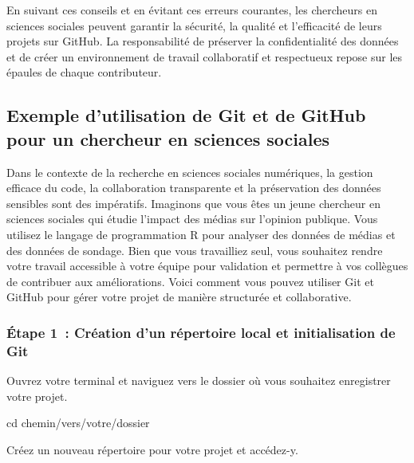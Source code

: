 \documentclass[
  letterpaper,
]{scrbook}
\newenvironment{Shaded}{\begin{snugshade}}{\end{snugshade}}
\newcommand{\BuiltInTok}[1]{\textcolor[rgb]{0.00,0.23,0.31}{#1}}
\newcommand{\NormalTok}[1]{\textcolor[rgb]{0.00,0.23,0.31}{#1}}
\begin{document}
En suivant ces conseils et en évitant ces erreurs courantes, les
chercheurs en sciences sociales peuvent garantir la sécurité, la qualité
et l'efficacité de leurs projets sur GitHub. La responsabilité de
préserver la confidentialité des données et de créer un environnement de
travail collaboratif et respectueux repose sur les épaules de chaque
contributeur.

\hypertarget{exemple-dutilisation-de-git-et-de-github-pour-un-chercheur-en-sciences-sociales}{%
\subsection{Exemple d'utilisation de Git et de GitHub pour un chercheur
en sciences
sociales}\label{exemple-dutilisation-de-git-et-de-github-pour-un-chercheur-en-sciences-sociales}}

Dans le contexte de la recherche en sciences sociales numériques, la
gestion efficace du code, la collaboration transparente et la
préservation des données sensibles sont des impératifs. Imaginons que
vous êtes un jeune chercheur en sciences sociales qui étudie l'impact
des médias sur l'opinion publique. Vous utilisez le langage de
programmation R pour analyser des données de médias et des données de
sondage. Bien que vous travailliez seul, vous souhaitez rendre votre
travail accessible à votre équipe pour validation et permettre à vos
collègues de contribuer aux améliorations. Voici comment vous pouvez
utiliser Git et GitHub pour gérer votre projet de manière structurée et
collaborative.

\hypertarget{uxe9tape-1-cruxe9ation-dun-ruxe9pertoire-local-et-initialisation-de-git}{%
\subsubsection{Étape 1~: Création d'un répertoire local et
initialisation de
Git}\label{uxe9tape-1-cruxe9ation-dun-ruxe9pertoire-local-et-initialisation-de-git}}

Ouvrez votre terminal et naviguez vers le dossier où vous souhaitez
enregistrer votre projet.

\begin{Shaded}
\begin{Highlighting}[]
\BuiltInTok{cd}\NormalTok{ chemin/vers/votre/dossier}
\end{Highlighting}
\end{Shaded}

Créez un nouveau répertoire pour votre projet et accédez-y.
\end{document}
